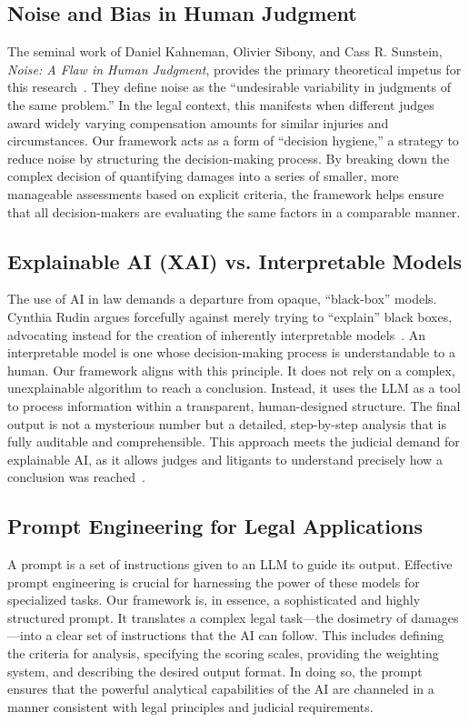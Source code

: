 \documentclass[11pt,a4paper]{article}
\begin{document}
\subsection{Noise and Bias in Human Judgment}

The seminal work of Daniel Kahneman, Olivier Sibony, and Cass R. Sunstein, \textit{Noise: A Flaw in Human Judgment}, provides the primary theoretical impetus for this research~\cite{kahneman2021noise}. They define noise as the ``undesirable variability in judgments of the same problem.'' In the legal context, this manifests when different judges award widely varying compensation amounts for similar injuries and circumstances. Our framework acts as a form of ``decision hygiene,'' a strategy to reduce noise by structuring the decision-making process. By breaking down the complex decision of quantifying damages into a series of smaller, more manageable assessments based on explicit criteria, the framework helps ensure that all decision-makers are evaluating the same factors in a comparable manner.

\subsection{Explainable AI (XAI) vs. Interpretable Models}

The use of AI in law demands a departure from opaque, ``black-box'' models. Cynthia Rudin argues forcefully against merely trying to ``explain'' black boxes, advocating instead for the creation of inherently interpretable models~\cite{rudin2019stop}. An interpretable model is one whose decision-making process is understandable to a human. Our framework aligns with this principle. It does not rely on a complex, unexplainable algorithm to reach a conclusion. Instead, it uses the LLM as a tool to process information within a transparent, human-designed structure. The final output is not a mysterious number but a detailed, step-by-step analysis that is fully auditable and comprehensible. This approach meets the judicial demand for explainable AI, as it allows judges and litigants to understand precisely how a conclusion was reached~\cite{deeks2019judicial}.

\subsection{Prompt Engineering for Legal Applications}

A prompt is a set of instructions given to an LLM to guide its output. Effective prompt engineering is crucial for harnessing the power of these models for specialized tasks. Our framework is, in essence, a sophisticated and highly structured prompt. It translates a complex legal task---the dosimetry of damages---into a clear set of instructions that the AI can follow. This includes defining the criteria for analysis, specifying the scoring scales, providing the weighting system, and describing the desired output format. In doing so, the prompt ensures that the powerful analytical capabilities of the AI are channeled in a manner consistent with legal principles and judicial requirements.
\end{document}
